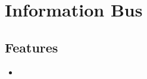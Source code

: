 \section{Information Bus}
\label{bundle:InformationBus}
\ClearAPI
\TODO

\subsection{Features}
\begin{itemize}
	\item \TODO
\end{itemize}

